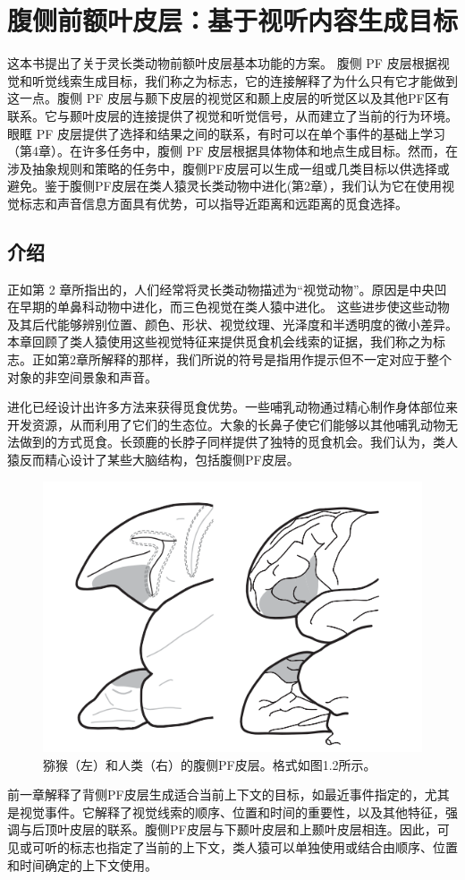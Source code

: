 \chapter{腹侧前额叶皮层：基于视听内容生成目标}
这本书提出了关于灵长类动物前额叶皮层基本功能的方案。
腹侧 PF 皮层根据视觉和听觉线索生成目标，我们称之为标志，它的连接解释了为什么只有它才能做到这一点。腹侧 PF 皮层与颞下皮层的视觉区和颞上皮层的听觉区以及其他PF区有联系。它与颞叶皮层的连接提供了视觉和听觉信号，从而建立了当前的行为环境。眼眶 PF 皮层提供了选择和结果之间的联系，有时可以在单个事件的基础上学习（第4章）。在许多任务中，腹侧 PF 皮层根据具体物体和地点生成目标。然而，在涉及抽象规则和策略的任务中，腹侧PF皮层可以生成一组或几类目标以供选择或避免。鉴于腹侧PF皮层在类人猿灵长类动物中进化(第2章），我们认为它在使用视觉标志和声音信息方面具有优势，可以指导近距离和远距离的觅食选择。
\section{介绍}
\par
正如第 2 章所指出的，人们经常将灵长类动物描述为“视觉动物”。原因是中央凹在早期的单鼻科动物中进化，而三色视觉在类人猿中进化。 这些进步使这些动物及其后代能够辨别位置、颜色、形状、视觉纹理、光泽度和半透明度的微小差异。本章回顾了类人猿使用这些视觉特征来提供觅食机会线索的证据，我们称之为标志。正如第2章所解释的那样，我们所说的符号是指用作提示但不一定对应于整个对象的非空间景象和声音。
\par
进化已经设计出许多方法来获得觅食优势。一些哺乳动物通过精心制作身体部位来开发资源，从而利用了它们的生态位。大象的长鼻子使它们能够以其他哺乳动物无法做到的方式觅食。长颈鹿的长脖子同样提供了独特的觅食机会。我们认为，类人猿反而精心设计了某些大脑结构，包括腹侧PF皮层。
\begin{figure}
	\centering
	\includegraphics[width=0.7\linewidth]{image_pfc/Fig_7_1}
	\caption{猕猴（左）和人类（右）的腹侧PF皮层。格式如图1.2所示。}
	\label{fig:fig}
\end{figure}
\par
前一章解释了背侧PF皮层生成适合当前上下文的目标，如最近事件指定的，尤其是视觉事件。它解释了视觉线索的顺序、位置和时间的重要性，以及其他特征，强调与后顶叶皮层的联系。腹侧PF皮层与下颞叶皮层和上颞叶皮层相连。因此，可见或可听的标志也指定了当前的上下文，类人猿可以单独使用或结合由顺序、位置和时间确定的上下文使用。
